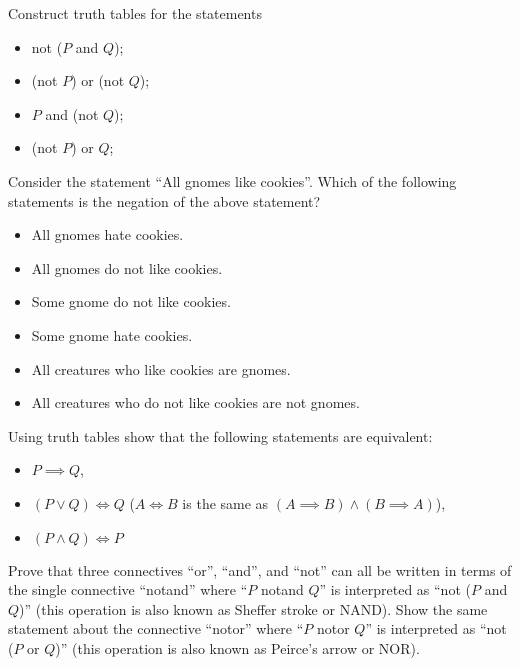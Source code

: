 \begin{chapterendexercises}
  \exercise Construct truth tables for the statements
    \begin{itemize}
      \item not ($P$ and $Q$);
      \item (not $P$) or (not $Q$);
      \item $P$ and (not $Q$);
      \item (not $P$) or $Q$;
    \end{itemize}
  \exercise Consider the statement ``All gnomes like cookies''. Which of
    the following statements is the negation of the above statement?
    \begin{itemize}
      \item All gnomes hate cookies.
      \item All gnomes do not like cookies.
      \item Some gnome do not like cookies.
      \item Some gnome hate cookies.
      \item All creatures who like cookies are gnomes.
      \item All creatures who do not like cookies are not gnomes.
    \end{itemize}
  \exercise Using truth tables show that the following statements are
    equivalent:
    \begin{itemize}
      \item $P \implies Q$,
      \item $(P \lor Q) \iff Q$
        ($A \iff B$ is the same as $(A \implies B) \land (B \implies A)$),
      \item $(P \land Q) \iff P$
    \end{itemize}
  \exercise Prove that three connectives ``or'', ``and'', and ``not'' can
    all be written in terms of the single connective ``notand'' where ``$P$
    notand $Q$'' is interpreted as ``not ($P$ and $Q$)'' (this operation is
    also known as Sheffer stroke or NAND).
  \exercise Show the same statement about the connective ``notor'' where
    ``$P$ notor $Q$'' is interpreted as ``not ($P$ or $Q$)'' (this operation is
    also known as Peirce's arrow or NOR).
\end{chapterendexercises}
